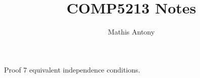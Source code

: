 \documentclass[a4paper]{scrartcl}
\title{COMP5213 Notes}
\author{Mathis Antony}
\begin{document}
\maketitle
Proof 7 equivalent independence conditions.
\end{document}
